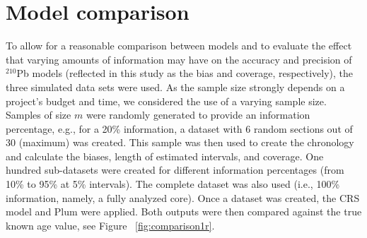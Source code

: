 \documentclass [10pt] {article}
\begin{document}

\section{Model comparison}

To allow for a reasonable comparison between models and to evaluate the effect that varying amounts of information may have on the accuracy and precision of $^{210}$Pb models (reflected in this study as the bias and coverage, respectively), the three simulated data sets were used. As the sample size strongly depends on a project's budget and time, we considered the use of a varying sample size. Samples of size $m$ were randomly generated to provide an information percentage, e.g., for a 20\% information, a dataset with 6 random sections out of 30 (maximum) was created. This sample was then used to create the chronology and calculate the biases, length of estimated intervals, and coverage. One hundred sub-datasets were created for different information percentages (from 10\% to 95\% at 5\% intervals). The complete dataset was also used (i.e., 100\% information, namely, a fully analyzed core). Once a dataset was created, the CRS model and Plum were applied. Both outputs were then compared against the true known age value, see Figure ~\ref{fig:comparison1r}.
\end{document}

